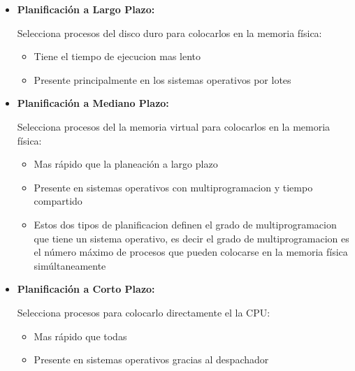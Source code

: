 \documentclass[12pt, fleqn]{report}                             %
\begin{document}
                \begin{itemize}
                    \item
                        \textbf{Planificación a Largo Plazo:}

                        Selecciona procesos del disco duro para colocarlos en la memoria física:
                        \begin{itemize}
                            \item Tiene el tiempo de ejecucion mas lento
                            \item Presente principalmente en los sistemas operativos por lotes
                        \end{itemize}

                    \item
                        \textbf{Planificación a Mediano Plazo:}

                        Selecciona procesos del la memoria virtual para colocarlos en la memoria física:
                        \begin{itemize}
                            \item Mas rápido que la planeación a largo plazo
                            \item Presente en sistemas operativos con multiprogramacion y tiempo compartido
                            \item Estos dos tipos de planificacion definen el grado de multiprogramacion que tiene
                                un sistema operativo, es decir el grado de multiprogramacion es el número máximo
                                de procesos que pueden colocarse en la memoria física simúltaneamente
                        \end{itemize}

                    \item
                        \textbf{Planificación a Corto Plazo:}

                        Selecciona procesos para colocarlo directamente el la CPU:
                        \begin{itemize}
                            \item Mas rápido que todas
                            \item Presente en sistemas operativos gracias al despachador
                        \end{itemize}

                \end{itemize}
\end{document}
